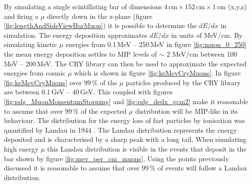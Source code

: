 By simulating a single scintillating bar of dimensions $4\,\textrm{cm} \times 152\,\textrm{cm} \times 1\,\textrm{cm}$ (x,y,z) and firing a $\mu$ directly down in the z-plane (figure \ref{fig:lengthAndSideViewBarMuon}) it is possible to determine the $dE/dx$ in simulation. The energy deposition approximates $dE/dx$ in units of MeV/cm. By simulating kinetic $\mu$ energies from 0.1\,MeV -- 250\,MeV in figure \ref{fig:muon_0_250} the mean energy deposition settles to MIP levels of $\sim$ 2 MeV/cm between 100\,MeV -- 200\,MeV. The CRY library \cite{ieee_cry_2007} can then be used to approximate the expected energies from cosmic $\mu$ which is shown in figure \ref{fig:keMevCryMuons}. In figure \ref{fig:keMevCryMuons} over 99\,\% of the $\mu$ particles produced by the CRY library are between 0.1\,GeV -- 40\,GeV. This coupled with figures \ref{fig:pdg_MuonMomentumStopping} and \ref{fig:pdg_dedx_gcm2} make it reasonable to assume that over 99\,\% of the expected $\mu$ distribution will be MIP-like in its behaviour. The distribution for the energy loss of fast particles by ionisation was quantified by Landau in 1944 \cite{landau1944energy}. The Landau distribution represents the energy deposited and is characterised by a sharp peak with a long tail. When simulating high energy $\mu$ this Landau distribution is visible in the events that deposit in the bar shown by figure \ref{fig:mev_per_cm_muons}. Using the points previously discussed it is reasonable to assume that over 99\,\% of events will follow a Landau distribution. %

